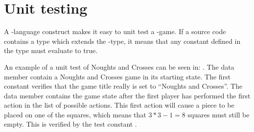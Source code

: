 

\section{Unit testing}
A \productname{}-language construct makes it easy to unit test a \productname{}-game.
If a source code contains a type which extends the -type, it means that any constant defined in the type must evaluate to true.

An example of a unit test of Noughts and Crosses can be seen in:
.
The data member  contain a Noughts and Crosses game in its starting state.
The first constant  verifies that the game title really is set to ``Noughts and Crosses''.
The data member  contains the game state after the first player has 
performed the first action in the list of possible actions. This first action will cause a piece to be placed on one of the squares, which means 
that $3*3 - 1 = 8$ squares must still be empty. This is verified by the test constant .


